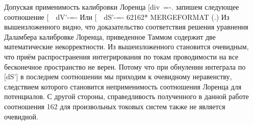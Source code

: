 \documentclass[11pt]{article}
\begin{document}
Допуская применимость калибровки Лоренца
{[}div~=-\frac{\partial \varphi }{\partial t}{]}.
запишем следующее соотношение
{[}~~dV'-=-\frac{\partial \rho \left( x',y',z',t' \right)}{\partial t'}{]}
Или
{[}~~dS'-=-\frac{\partial \rho \left( x',y',z',t' \right)}{\partial t'}{]}
62162* MERGEFORMAT (.) Из вышеизложенного видно, что доказательство
соответствия решения уравнения Даламбера калибровке Лоренца, приведенное
Таммом содержит две математические некорректности. Из вышеизложенного
становится очевидным, что приём распространения интегрирования по токам
проводимости на все бесконечное пространство не верен. Потому что при
обнулении интеграла по {[}dS'{]} в последнем соотношении мы приходим к
очевидному неравенству, следствием которого становится неприменимость
соотношения Лоренца для потенциалов. С другой стороны, справедливость
полученного в данной работе соотношения 162 для произвольных токовых
систем также не является очевидной.
\end{document}
